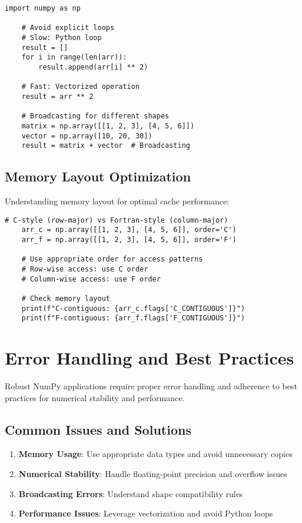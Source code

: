 \begin{lstlisting}[language=MyPython, caption={Vectorization Examples}, label={lst:vectorization}]
	import numpy as np
	
	# Avoid explicit loops
	# Slow: Python loop
	result = []
	for i in range(len(arr)):
	    result.append(arr[i] ** 2)
	
	# Fast: Vectorized operation
	result = arr ** 2
	
	# Broadcasting for different shapes
	matrix = np.array([[1, 2, 3], [4, 5, 6]])
	vector = np.array([10, 20, 30])
	result = matrix + vector  # Broadcasting
\end{lstlisting}

\subsection{Memory Layout Optimization}
\label{subsec:memory_layout}

Understanding memory layout for optimal cache performance:

\begin{lstlisting}[language=MyPython, caption={Memory Layout Optimization}, label={lst:memory_layout}]
	# C-style (row-major) vs Fortran-style (column-major)
	arr_c = np.array([[1, 2, 3], [4, 5, 6]], order='C')
	arr_f = np.array([[1, 2, 3], [4, 5, 6]], order='F')
	
	# Use appropriate order for access patterns
	# Row-wise access: use C order
	# Column-wise access: use F order
	
	# Check memory layout
	print(f"C-contiguous: {arr_c.flags['C_CONTIGUOUS']}")
	print(f"F-contiguous: {arr_f.flags['F_CONTIGUOUS']}")
\end{lstlisting}

\section{Error Handling and Best Practices}
\label{sec:best_practices}

Robust NumPy applications require proper error handling and adherence to best practices for numerical stability and performance.

\subsection{Common Issues and Solutions}
\label{subsec:common_issues}

\begin{enumerate}
	\item \textbf{Memory Usage}: Use appropriate data types and avoid unnecessary copies
	\item \textbf{Numerical Stability}: Handle floating-point precision and overflow issues
	\item \textbf{Broadcasting Errors}: Understand shape compatibility rules
	\item \textbf{Performance Issues}: Leverage vectorization and avoid Python loops
\end{enumerate}

